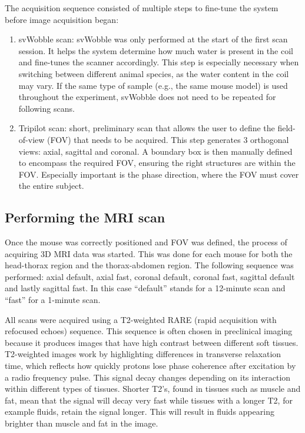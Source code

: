 \documentclass[twocolumn]{article}
\begin{document}
The acquisition sequence consisted of multiple steps to fine-tune the system before image acquisition began: 

\begin{enumerate}
\item svWobble scan: svWobble was only performed at the start of the first scan session. It helps the system determine how much water is present in the coil and fine-tunes the scanner accordingly. 
This step is especially necessary when switching between different animal species, as the water content in the coil may vary. 
If the same type of sample (e.g., the same mouse model) is used throughout the experiment, svWobble does not need to be repeated for following scans.
\item Tripilot scan:  short, preliminary scan that allows the user to define the field-of-view (FOV) that needs to be acquired. 
This step generates 3 orthogonal views: axial, sagittal and coronal. A boundary box is then manually defined to encompass the required FOV, ensuring the right structures are within the FOV. 
Especially important is the phase direction, where the FOV must cover the entire subject.
\end{enumerate}

\subsection{Performing the MRI scan}

Once the mouse was correctly positioned and FOV was defined, the process of acquiring 3D MRI data was started. 
This was done for each mouse for both the head-thorax region and the thorax-abdomen region. 
The following sequence was performed: axial default, axial fast, coronal default, coronal fast, sagittal default and lastly sagittal fast. 
In this case ``default'' stands for a 12-minute scan and ``fast'' for a 1-minute scan.

All scans were acquired using a T2-weighted RARE (rapid acquisition with refocused echoes) sequence. 
This sequence is often chosen in preclinical imaging because it produces images that have high contrast between different soft tissues. 
T2-weighted images work by highlighting differences in transverse relaxation time, which reflects how quickly protons lose phase coherence after excitation by a radio frequency pulse. 
This signal decay changes depending on its interaction within different types of tissues. 
Shorter T2's, found in tissues such as muscle and fat, mean that the signal will decay very fast while tissues with a longer T2, for example fluids, retain the signal longer. 
This will result in fluids appearing brighter than muscle and fat in the image. 
\end{document}
